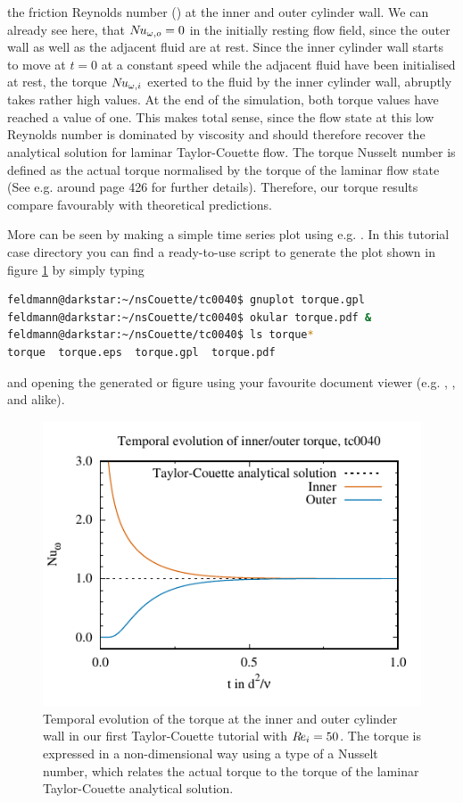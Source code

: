 \documentclass[a4paper, 11pt, DIV=11]{scrartcl}
\begin{document}
the friction Reynolds number (\ReTau) at the inner and outer cylinder wall. We can
already see here, that $N\hspace{-0.1em}u_{\omega,o}=0$ in the initially resting flow field, since the
outer wall as well as the adjacent fluid are at rest. Since the inner cylinder
wall starts to move at $t=0$ at a constant speed while the adjacent fluid have
been initialised at rest, the torque $N\hspace{-0.1em}u_{\omega,i}$ exerted to the fluid by the inner
cylinder wall, abruptly takes rather high values. At the end of the simulation,
both torque values have reached a value of one. This makes total sense, since the
flow state at this low Reynolds number is dominated by viscosity and should
therefore recover the analytical solution for laminar Taylor-Couette flow. The
torque Nusselt number is defined as the actual torque normalised by the torque of
the laminar flow state (See %
e.g. \cite{Brauckmann2016} around page \num{426} for further details). 
Therefore, our torque results compare favourably with theoretical predictions. 
\par More can be seen by making a simple time series plot using e.g. 
. In this tutorial case directory you can find a ready-to-use 
script to generate the plot shown in figure \ref{fig:tc0040torque} by simply 
typing
\begin{lstlisting}[language=bash]
feldmann@darkstar:~/nsCouette/tc0040$ gnuplot torque.gpl
feldmann@darkstar:~/nsCouette/tc0040$ okular torque.pdf &
feldmann@darkstar:~/nsCouette/tc0040$ ls torque*
torque	torque.eps  torque.gpl	torque.pdf
\end{lstlisting}
and opening the generated  or  figure using your
favourite document  viewer (e.g. , , 
and alike).
\begin{figure}[htb]
\centering
\includegraphics[scale=1.0, trim=0mm 0mm 0mm 6mm, clip=true]{figures/tc0040/torque}
\caption{Temporal evolution of the torque at the inner and outer cylinder
wall in our first Taylor-Couette tutorial  with $R\hspace{-0.1em}e_{i}=\num{50}$.
The torque is expressed in a non-dimensional way using a type of a Nusselt
number, which relates the actual torque to the torque of the laminar
Taylor-Couette analytical solution.}
\label{fig:tc0040torque}
\end{figure}
\end{document}
